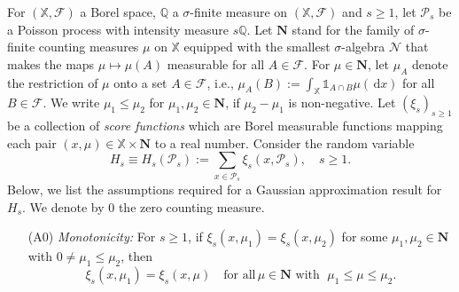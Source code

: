 \documentclass[11pt,reqno]{amsart}
\numberwithin{equation}{section}
\theoremstyle{definition}
\newcommand{\M}{\mu}
\newcommand{\sP}{\mathcal{P}}
\newcommand{\XX}{\mathbb{X}}
\newcommand{\QQ}{\mathbb{Q}}
\newcommand{\F}{\mathcal{F}}
\newcommand{\Nb}{\mathbf{N}}
\newcommand{\diff}{{\,\mathrm d}}
\begin{document}
 
For $(\XX,\F)$ a Borel space, $\QQ$ a $\sigma$-finite
measure on $(\XX, \F)$ and $s \ge 1$, let $\sP_s$ be a Poisson
process with intensity measure $s\QQ$. Let $\Nb$ stand for the family of $\sigma$-finite counting
measures $\M$ on $\XX$ equipped with the smallest $\sigma$-algebra
$\mathscr{N}$ that makes the maps $\M \mapsto \M(A)$ measurable for
all $A \in \F$. 
For $\mu \in \Nb$, let $\M_A$ denote the
restriction of $\M$ onto a set $A\in\F$, i.e., $\M_A(B):=\int_\XX \mathds{1}_{A \cap B} \M(\diff x)$ for all $B \in \F$. We write $\M_1\leq\M_2$ for $\M_1,\M_2\in\Nb$,
if $\M_2-\M_1$ is non-negative. Let $(\xi_s)_{s \ge 1}$ be a collection of \emph{score functions} which are Borel measurable functions mapping each
pair $(x,\M) \in \XX \times \Nb$ to a real number.
Consider the random variable
\begin{equation}
\label{eq:hs}
H_s \equiv H_s(\sP_s):= \sum_{x \in \sP_s} \xi_s(x,\sP_s), \quad s \ge 1.
\end{equation}
Below, we list the assumptions required for a Gaussian approximation result for $H_s$. We denote by $0$ the zero counting measure.
\begin{enumerate}
	\item[(A0)]\textit{Monotonicity:} For $s \ge 1$, if
	$\xi_s(x, \M_1)=\xi_s(x, \M_2)$ for some $\M_1,\M_2 \in \Nb$ with
	$0 \neq \M_1\leq \M_2$, then
	\begin{equation*}
	\xi_s(x, \M_1)=\xi_s(x, \M) \quad 
	\text{for all} \, \M\in\Nb \text{ with  } \; \M_1\leq \M\leq \M_2.
	\end{equation*}
\end{enumerate}
\end{document}
